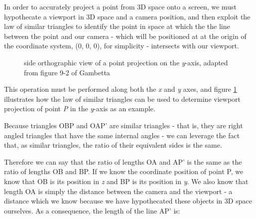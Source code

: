 \documentclass[11pt]{article}
\begin{document}
In order to accurately project a point from 3D space onto a screen, we must hypothecate a viewport in 3D space
and a camera position, and then exploit the law of similar triangles to identify the point in space at
which the the line between the point and our camera - which will be positioned at at the origin of the
coordinate system, (0, 0, 0), for simplicity - intersects with our viewport.

\begin{figure}
   \centering
   \caption{side orthographic view of a point projection on the \textit{y}-axis, adapted from figure 9-2 of Gambetta
   \cite[p. 106]{gambetta}}
   \label{fig:triangles}
\end{figure}

This operation must be performed along both the \textit{x} and \textit{y} axes, and figure \ref{fig:triangles}
illustrates how the law of similar triangles can be used to determine viewport projection of point \textit{P}
in the \textit{y}-axis as an example. \cite[p. 106]{gambetta}

Because triangles OBP and OAP' are similar triangles - that is, they are right angled triangles that have the same
internal angles - we can leverage the fact that, as similar triangles, the ratio of their equivalent sides is the same.

Therefore we can say that the ratio of lengths OA and AP' is the same as the ratio of lengths OB and BP. If we know
the coordinate position of point P, we know that OB is its position in \textit{z} and BP is its position in \textit{y}.
We also know that length OA is simply the distance between the camera and the viewport - a distance which we know because
we have hypothecated these objects in 3D space ourselves. As a consequence, the length of the line AP' is:
\end{document}
